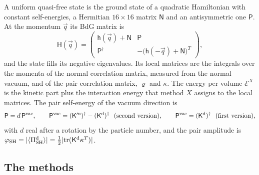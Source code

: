 \documentclass[aps,prd,onecolumn,superscriptaddress,nofootinbib,floatfix,longbibliography]{revtex4-2}
\newcommand{\SH}{{\rm SH}}
\newcommand{\tr}{\mathrm{tr}}
\begin{document}
A uniform quasi-free state is the ground state of a quadratic Hamiltonian with constant self-energies, a Hermitian
$16\times16$ matrix $\mathsf N$ and an antisymmetric one $\mathsf P$. At the momentum $\vec q$ its BdG matrix is
\begin{equation}
\mathsf H(\vec q)=\begin{pmatrix}\mathsf h(\vec q)+\mathsf N&\mathsf P\\\mathsf P^\dagger&-\big(\mathsf h(-\vec q)+\mathsf N\big)^T\end{pmatrix},
\label{eq:BdG}
\end{equation}
and the state fills its negative eigenvalues. Its local matrices are the integrals over the momenta of the normal
correlation matrix, measured from the normal vacuum, and of the pair correlation matrix, $\varrho$ and $\kappa$. The energy
per volume $\mathcal E^X$ is the kinetic part plus the interaction energy that method $X$ assigns to the local matrices.
The pair self-energy of the vacuum direction is
\begin{equation}
\mathsf P=d\,\mathsf P^{\rm vac},\qquad \mathsf P^{\rm vac}=(\mathsf K'^{\rm u})^\dagger-(\mathsf K^{\rm d})^\dagger\ \ \text{(second version)},\qquad
\mathsf P^{\rm vac}=(\mathsf K^{\rm d})^\dagger\ \ \text{(first version)},
\label{eq:Pvac}
\end{equation}
with $d$ real after a rotation by the particle number, and the pair amplitude is
$\varphi_\SH=|\langle\Pi^{\rm d}_\SH\rangle|=\frac12|\tr(\mathsf K^{\rm d}\kappa^T)|$.

\subsection{The methods}
\end{document}
